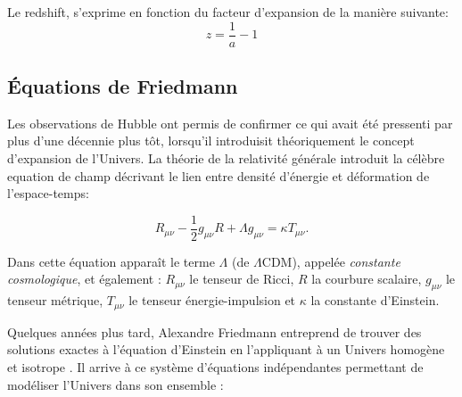 Le redshift, s'exprime en fonction du facteur d'expansion de la manière suivante:
\begin{equation}
z= \frac{1}{a}-1
\end{equation}

\subsection{Équations de Friedmann}
\label{sec:friedman}

Les observations de Hubble ont permis de confirmer ce qui avait été pressenti par \cite{1916AnP...354..769E} plus d'une décennie plus tôt, lorsqu'il introduisit théoriquement le concept d'expansion de l'Univers. 
La théorie de la relativité générale introduit la célèbre equation de champ décrivant le lien entre densité d'énergie et déformation de l'espace-temps:

\begin{equation}
R_{\mu\nu} - \frac{1}{2} g_{\mu\nu}R + \Lambda g_{\mu\nu}  = \kappa T_{\mu\nu}.
\label{eq:einstein}
\end{equation} 

Dans cette équation apparaît le terme $\Lambda$ (de $\Lambda$CDM), appelée \textit{constante cosmologique}, et également :
$R_{\mu \nu}$ le tenseur de Ricci, $R$ la courbure scalaire, $g_{\mu \nu}$ le tenseur métrique, $T_{\mu \nu }$ le tenseur énergie-impulsion et $\kappa$ la constante d'Einstein.


Quelques années plus tard, Alexandre Friedmann entreprend de trouver des solutions exactes à l'équation d'Einstein en l'appliquant à un Univers homogène et isotrope \citep{1922ZPhy...10..377F}.
Il arrive à ce système d'équations indépendantes permettant de modéliser l'Univers dans son ensemble :

% 
%
% 
 
